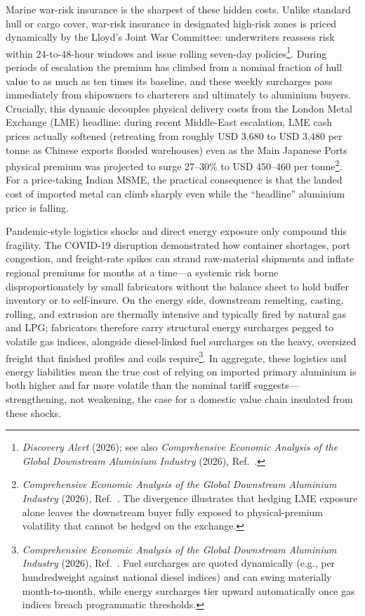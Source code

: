\documentclass[11pt, a4paper]{article}
\numberwithin{figure}{section}
\numberwithin{table}{section}
\begin{document}
Marine war-risk insurance is the sharpest of these hidden costs. Unlike standard hull or cargo cover, war-risk insurance in designated high-risk zones is priced dynamically by the Lloyd's Joint War Committee: underwriters reassess risk within 24-to-48-hour windows and issue rolling seven-day policies\footnote{\textit{Discovery Alert} (2026); see also \textit{Comprehensive Economic Analysis of the Global Downstream Aluminium Industry} (2026), Ref.~\cite{costreg2026}.}. During periods of escalation the premium has climbed from a nominal fraction of hull value to as much as ten times its baseline, and these weekly surcharges pass immediately from shipowners to charterers and ultimately to aluminium buyers. Crucially, this dynamic decouples physical delivery costs from the London Metal Exchange (LME) headline: during recent Middle-East escalation, LME cash prices actually softened (retreating from roughly USD 3,680 to USD 3,480 per tonne as Chinese exports flooded warehouses) even as the Main Japanese Ports physical premium was projected to surge 27--30\% to USD 450--460 per tonne\footnote{\textit{Comprehensive Economic Analysis of the Global Downstream Aluminium Industry} (2026), Ref.~\cite{costreg2026}. The divergence illustrates that hedging LME exposure alone leaves the downstream buyer fully exposed to physical-premium volatility that cannot be hedged on the exchange.}. For a price-taking Indian MSME, the practical consequence is that the landed cost of imported metal can climb sharply even while the ``headline'' aluminium price is falling.

Pandemic-style logistics shocks and direct energy exposure only compound this fragility. The COVID-19 disruption demonstrated how container shortages, port congestion, and freight-rate spikes can strand raw-material shipments and inflate regional premiums for months at a time—a systemic risk borne disproportionately by small fabricators without the balance sheet to hold buffer inventory or to self-insure. On the energy side, downstream remelting, casting, rolling, and extrusion are thermally intensive and typically fired by natural gas and LPG; fabricators therefore carry structural energy surcharges pegged to volatile gas indices, alongside diesel-linked fuel surcharges on the heavy, oversized freight that finished profiles and coils require\footnote{\textit{Comprehensive Economic Analysis of the Global Downstream Aluminium Industry} (2026), Ref.~\cite{costreg2026}. Fuel surcharges are quoted dynamically (e.g., per hundredweight against national diesel indices) and can swing materially month-to-month, while energy surcharges tier upward automatically once gas indices breach programmatic thresholds.}. In aggregate, these logistics and energy liabilities mean the true cost of relying on imported primary aluminium is both higher and far more volatile than the nominal tariff suggests—strengthening, not weakening, the case for a domestic value chain insulated from these shocks.
\end{document}
